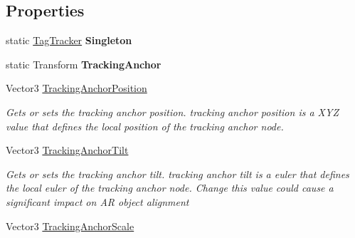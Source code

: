 \subsection*{Properties}
\begin{DoxyCompactItemize}
\item 
\mbox{\label{class_ximmerse_1_1_slide_in_s_d_k_1_1_tag_tracker_a7a9a802a63a4b529339e0455d8f1a3b0}} 
static \mbox{\hyperlink{class_ximmerse_1_1_slide_in_s_d_k_1_1_tag_tracker}{Tag\+Tracker}} {\bfseries Singleton}
\item 
\mbox{\label{class_ximmerse_1_1_slide_in_s_d_k_1_1_tag_tracker_a9d33ebf8a2972b1c970e49da6607d317}} 
static Transform {\bfseries Tracking\+Anchor}
\item 
Vector3 \mbox{\hyperlink{class_ximmerse_1_1_slide_in_s_d_k_1_1_tag_tracker_a54233a1b38c3832eed8a3557f25bf873}{Tracking\+Anchor\+Position}}
\begin{DoxyCompactList}\small\item\em Gets or sets the tracking anchor position. tracking anchor position is a X\+YZ value that defines the local position of the tracking anchor node. \end{DoxyCompactList}\item 
Vector3 \mbox{\hyperlink{class_ximmerse_1_1_slide_in_s_d_k_1_1_tag_tracker_a13f4739d9521aaef56b3862838944088}{Tracking\+Anchor\+Tilt}}
\begin{DoxyCompactList}\small\item\em Gets or sets the tracking anchor tilt. tracking anchor tilt is a euler that defines the local euler of the tracking anchor node. Change this value could cause a significant impact on AR object alignment \end{DoxyCompactList}\item 
Vector3 \mbox{\hyperlink{class_ximmerse_1_1_slide_in_s_d_k_1_1_tag_tracker_af8d9223bd307ccb6eb12129d6950e715}{Tracking\+Anchor\+Scale}}

\end{DoxyCompactItemize}
